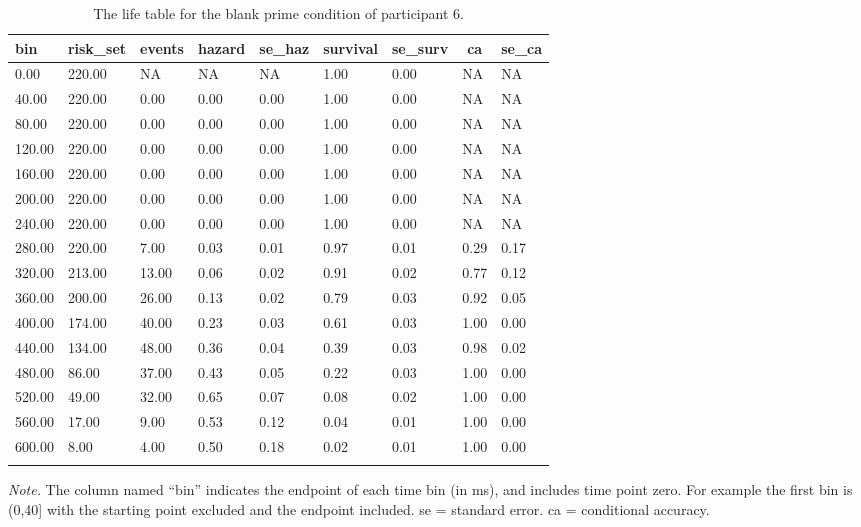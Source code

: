\documentclass[
  man,floatsintext]{apa6}
\begin{document}
\begin{table}[H]

\begin{center}
\begin{threeparttable}

\caption{\label{tab:life-table}The life table for the blank prime condition of participant 6.}

\begin{tabular}{lllllllll}
\toprule
bin & \multicolumn{1}{c}{risk\_set} & \multicolumn{1}{c}{events} & \multicolumn{1}{c}{hazard} & \multicolumn{1}{c}{se\_haz} & \multicolumn{1}{c}{survival} & \multicolumn{1}{c}{se\_surv} & \multicolumn{1}{c}{ca} & \multicolumn{1}{c}{se\_ca}\\
\midrule
0.00 & 220.00 & NA & NA & NA & 1.00 & 0.00 & NA & NA\\
40.00 & 220.00 & 0.00 & 0.00 & 0.00 & 1.00 & 0.00 & NA & NA\\
80.00 & 220.00 & 0.00 & 0.00 & 0.00 & 1.00 & 0.00 & NA & NA\\
120.00 & 220.00 & 0.00 & 0.00 & 0.00 & 1.00 & 0.00 & NA & NA\\
160.00 & 220.00 & 0.00 & 0.00 & 0.00 & 1.00 & 0.00 & NA & NA\\
200.00 & 220.00 & 0.00 & 0.00 & 0.00 & 1.00 & 0.00 & NA & NA\\
240.00 & 220.00 & 0.00 & 0.00 & 0.00 & 1.00 & 0.00 & NA & NA\\
280.00 & 220.00 & 7.00 & 0.03 & 0.01 & 0.97 & 0.01 & 0.29 & 0.17\\
320.00 & 213.00 & 13.00 & 0.06 & 0.02 & 0.91 & 0.02 & 0.77 & 0.12\\
360.00 & 200.00 & 26.00 & 0.13 & 0.02 & 0.79 & 0.03 & 0.92 & 0.05\\
400.00 & 174.00 & 40.00 & 0.23 & 0.03 & 0.61 & 0.03 & 1.00 & 0.00\\
440.00 & 134.00 & 48.00 & 0.36 & 0.04 & 0.39 & 0.03 & 0.98 & 0.02\\
480.00 & 86.00 & 37.00 & 0.43 & 0.05 & 0.22 & 0.03 & 1.00 & 0.00\\
520.00 & 49.00 & 32.00 & 0.65 & 0.07 & 0.08 & 0.02 & 1.00 & 0.00\\
560.00 & 17.00 & 9.00 & 0.53 & 0.12 & 0.04 & 0.01 & 1.00 & 0.00\\
600.00 & 8.00 & 4.00 & 0.50 & 0.18 & 0.02 & 0.01 & 1.00 & 0.00\\
\bottomrule
\addlinespace
\end{tabular}

\begin{tablenotes}[para]
\normalsize{\textit{Note.} The column named ``bin'' indicates the endpoint of each time bin (in ms), and includes time point zero. For example the first bin is (0,40{]} with the starting point excluded and the endpoint included. se = standard error. ca = conditional accuracy.}
\end{tablenotes}

\end{threeparttable}
\end{center}

\end{table}
\end{document}
